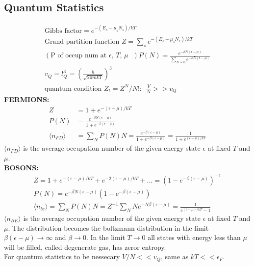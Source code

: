\documentclass[a4paper, norsk, 8pt]{article}
\begin{document}
\begin{multicols*}{3}
\subsection*{\footnotesize  Quantum Statistics}
\begin{gather*}
    \text{Gibbs factor} = e^{-(E_s - \mu_{s} N_{s})/kT} \\
    \text{Grand partition function}\,\, Z = \sum_s e^{-(E_s - \mu_s N_s)/kT} \\
    (\text{P of occup num at $\epsilon$, $T$, $\mu$  }) P(N) = \frac{e^{-\beta N(\epsilon - \mu)}}{\sum_{N=0}e^{-\beta N(\epsilon - \mu)}}\\
    v_Q = l_Q^3 = \left( \frac{h}{\sqrt{2\pi mkT}} \right)^3 \\
    \text{quantum condition $Z_t=Z^N/N!$:}\,\,\,\, \frac{V}{N} >> v_Q
\end{gather*}
\textbf{\textsc{FERMIONS:}}
\begin{align*}
    Z &= 1 + e^{-(\epsilon-\mu)/kT} \\
    P(N) &= \frac{e^{-\beta N(\epsilon-\mu)}}{1+e^{-\beta(\epsilon-\mu)}} \\
    \langle n_{FD} \rangle &= \sum_{N}P(N)N = \frac{e^{-\beta(\epsilon-\mu)}}{1+e^{-\beta(\epsilon-\mu)}} = \frac{1}{1+e^{(\epsilon-\mu)/kT}}
\end{align*}
$  \langle n_{FD} \rangle $ is the average occupation number of the given	energy state $\epsilon$ at fixed $T$ and $\mu$.\\
\textbf{\textsc{BOSONS:}}
\begin{gather*}
    Z = 1 + e^{-(\epsilon-\mu)/kT} + e^{-2(\epsilon-\mu)/kT} + ... = \left(1-e^{-\beta(\epsilon-\mu)}\right)^{-1}\\
    P(N) = e^{-\beta N(\epsilon-\mu)} \left(1-e^{-\beta(\epsilon-\mu)}\right) \\
    \langle n_{be} \rangle = \sum_{N}P(N)N = Z^{-1}\sum_N Ne^{-N\beta(\epsilon-\mu)} = \frac{1}{e^{(\epsilon-\mu)/kT}-1}
\end{gather*}
$  \langle n_{BE} \rangle $ is the average occupation number of the given	energy state $\epsilon$ at fixed $T$ and $\mu$.
The distribution becomes the boltzmann distribution in the limit $\beta\left( \epsilon - \mu \right) \rightarrow \infty $ and $\beta \rightarrow 0$.
In the limit $T\rightarrow 0$ all states with energy less than $\mu$ will be filled, called degenerate gas, has zeror entropy. \\
For quantum statistics to be nessecary $V/N <<v_Q$, same as $kT << \epsilon_F$.

\end{multicols*}
\end{document}
